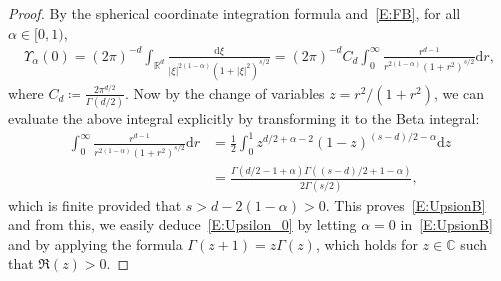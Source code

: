 \documentclass[a4paper,11pt]{article}%
\theoremstyle{plain}
\theoremstyle{definition}
\numberwithin{equation}{section}
\newcommand{\R}{\mathbb{R}}
\newcommand{\ud}{\ensuremath{\mathrm{d}}}
\begin{document}
\begin{proof}
  By the spherical coordinate integration formula and~\eqref{E:FB}, for all $\alpha\in[0,1)$,
  \begin{align*}
    \Upsilon_\alpha(0) = \left(2\pi\right)^{-d} \int_{\R^d} \frac{\ud\xi}{|\xi|^{2(1-\alpha)}\left(1+|\xi|^2\right)^{s/2}}
    = \left(2\pi\right)^{-d} C_d \int_0^\infty \frac{r^{d-1}}{r^{2(1-\alpha)}\left(1+r^2\right)^{s/2}} \ud r,
  \end{align*}
  where $C_d\coloneqq \frac{2\pi^{d/2}}{\Gamma\left(d/2\right)}$. Now by the change of variables
  $z = r^2 /(1+r^2)$, we can evaluate the above integral explicitly by transforming it to the Beta
  integral:
  \begin{align*}
    \int_0^\infty \frac{r^{d-1}}{r^{2(1-\alpha)}\left(1+r^2\right)^{s/2}} \ud r
     & = \frac{1}{2} \int_0^1 z^{d/2+\alpha-2}(1-z)^{(s-d)/2-\alpha}\ud z \\
     & = \frac{\Gamma\left(d/2-1+\alpha\right)\Gamma\left((s-d)/2+1-\alpha\right)}{2\Gamma(s/2)},
  \end{align*}
  which is finite provided that $s>d-2(1-\alpha)>0$. This proves~\eqref{E:UpsionB} and from this, we
  easily deduce~\eqref{E:Upsilon_0} by letting $\alpha = 0$ in~\eqref{E:UpsionB} and by applying the
  formula $\Gamma(z+1) = z\Gamma(z)$, which holds for $z\in \mathbb{C}$ such that $\Re(z)>0$.


\end{proof}
\end{document}
